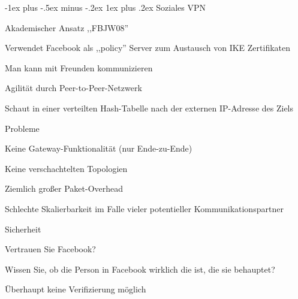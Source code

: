 \documentclass[a4paper]{article}
\makeatletter
\renewcommand{\subsubsection}{\@startsection{subsubsection}{3}{0mm}%
 {-1ex plus -.5ex minus -.2ex}%
 {1ex plus .2ex}%
 {\normalfont\small\bfseries}}
\makeatother
\begin{document}
\begin{multicols}{3}
\begin{itemize*}
            \subsubsection{Soziales VPN}
            \begin{itemize*}
                  \item Akademischer Ansatz ,,FBJW08''
                  \item Verwendet Facebook als ,,policy'' Server zum Austausch von IKE
                  Zertifikaten
                  \begin{itemize*}
                        \item Man kann mit Freunden kommunizieren
                  \end{itemize*}
                  \item Agilität durch Peer-to-Peer-Netzwerk
                  \begin{itemize*}
                        \item Schaut in einer verteilten Hash-Tabelle nach der externen IP-Adresse des Ziels
                  \end{itemize*}
                  \item Probleme
                  \begin{itemize*}
                        \item Keine Gateway-Funktionalität (nur Ende-zu-Ende)
                        \item Keine verschachtelten Topologien
                        \item Ziemlich großer Paket-Overhead
                        \item Schlechte Skalierbarkeit im Falle vieler potentieller Kommunikationspartner
                        \item Sicherheit
                        \begin{itemize*} \item Vertrauen Sie Facebook? \item Wissen Sie, ob die Person in Facebook wirklich die ist, die sie behauptet? \item Überhaupt keine Verifizierung möglich \end{itemize*}
                  \end{itemize*}
            \end{itemize*}


\end{itemize*}
\end{multicols}
\end{document}
